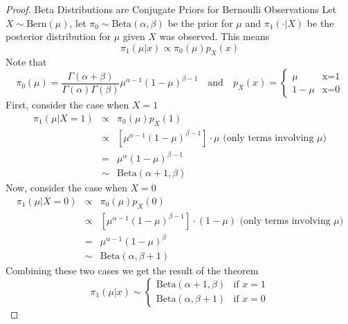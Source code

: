 \documentclass[11pt,a4paper]{article}
\begin{document}
  \begin{proof}{Beta Distributions are Conjugate Priors for Bernoulli Observations}
    Let $X\sim\text{Bern}(\mu)$, let $\pi_0\sim\text{Beta}(\alpha,\beta)$ be the prior for $\mu$ and $\pi_1(\cdot|X)$ be the posterior distribution for $\mu$ given $X$ was observed. This means
    \[ \pi_1(\mu|x)\propto\pi_0(\mu)p_X(x) \]
    Note that
    \[ \pi_0(\mu)=\frac{\Gamma(\alpha+\beta)}{\Gamma(\alpha)\Gamma(\beta)}\mu^{\alpha-1}(1-\mu)^{\beta-1}\quad\text{and}\quad p_X(x)=\begin{cases}\mu&\text{x=1}\\1-\mu&\text{x=0}\end{cases} \]
    First, consider the case when $X=1$
    \[\begin{array}{rcl}
      \pi_1(\mu|X=1)&\propto&\pi_0(\mu)p_X(1)\\
      &\propto&[\mu^{\alpha-1}(1-\mu)^{\beta-1}]\cdot\mu\text{ (only terms involving $\mu$)}\\
      &=&\mu^\alpha(1-\mu)^{\beta-1}\\
      &\sim&\text{Beta}(\alpha+1,\beta)
    \end{array}\]
    Now, consider the case when $X=0$
    \[\begin{array}{rcl}
      \pi_1(\mu|X=0)&\propto&\pi_0(\mu)p_X(0)\\
      &\propto&[\mu^{\alpha-1}(1-\mu)^{\beta-1}]\cdot(1-\mu)\text{ (only terms involving $\mu$)}\\
      &=&\mu^{\alpha-1}(1-\mu)^{\beta}\\
      &\sim&\text{Beta}(\alpha,\beta+1)
    \end{array}\]
    Combining these two cases we get the result of the theorem
    \[ \pi_1(\mu|x)\sim\begin{cases}\text{Beta}(\alpha+1,\beta)&\text{if }x=1\\\text{Beta}(\alpha,\beta+1)&\text{if }x=0\end{cases} \]
    \proved
  \end{proof}
\end{document}
